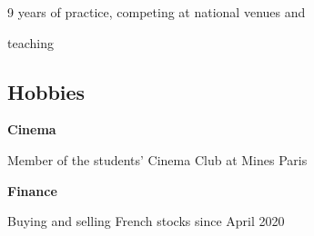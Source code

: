 \documentclass{article}
\begin{document}
\begin{multicols}{2}
		9 years of practice, competing at national venues and 

		teaching

\hfill

{\color{blue} \subsection*{Hobbies}}

		\noindent\textbf{Cinema}

		Member of the students' Cinema Club at Mines Paris

\hfill

		\noindent\textbf{Finance}

		Buying and selling French stocks since April 2020

\end{multicols}
\end{document}
